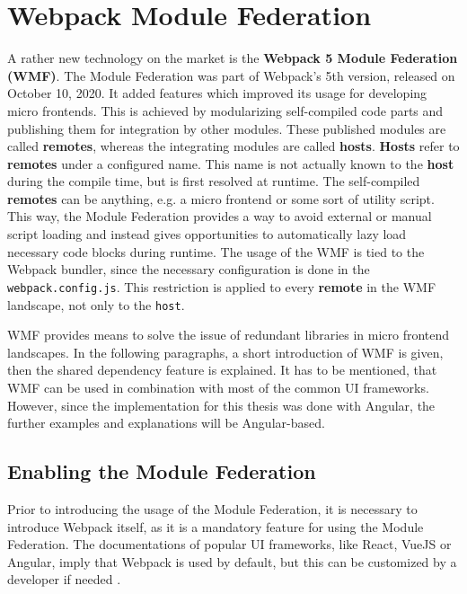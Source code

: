 \chapter{Webpack Module Federation} %
\label{Chapter5}


A rather new technology on the market is the \textbf{Webpack 5 Module Federation (WMF)}. The Module Federation was part of Webpack's 5th version, released on October 10, 2020. It added features which improved its usage for developing micro frontends.
This is achieved by modularizing self-compiled code parts and publishing them for integration by other modules. These published modules are called \textbf{remotes}, whereas the integrating modules are called \textbf{hosts}. 
\textbf{Hosts} refer to \textbf{remotes} under a configured name. This name is not actually known to the \textbf{host} during the compile time, but is first resolved at runtime.
The self-compiled \textbf{remotes} can be anything, e.g. a micro frontend or some sort of utility script. This way, the Module Federation provides a way to avoid external or manual script loading and instead gives opportunities to automatically lazy load necessary code blocks during runtime.\cite{wmf_concepts}
The usage of the WMF is tied to the Webpack bundler, since the necessary configuration is done in the \texttt{webpack.config.js}. This restriction is applied to every \textbf{remote} in the WMF landscape, not only to the \texttt{host}.

WMF provides means to solve the issue of redundant libraries in micro frontend landscapes. In the following paragraphs, a short introduction of WMF is given, then the shared dependency feature is explained.
It has to be mentioned, that WMF can be used in combination with most of the common UI frameworks. However, since the implementation for this thesis was done with Angular, the further examples and explanations will be Angular-based.

\section{Enabling the Module Federation}

Prior to introducing the usage of the Module Federation, it is necessary to introduce Webpack itself, as it is a mandatory feature for using the Module Federation. The documentations of popular UI frameworks, like React, VueJS or Angular, imply that Webpack is used by default, but this can be customized by a developer if needed \cite{webpack_angular}\cite{webpack_react}\cite{webpack_vue}.

